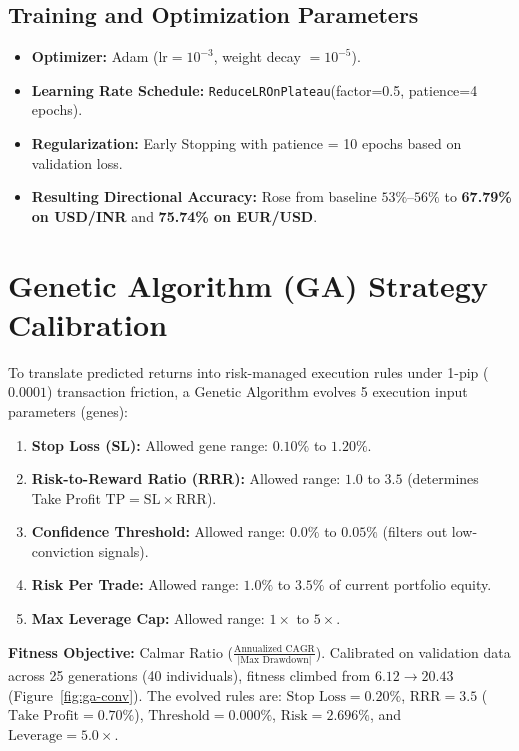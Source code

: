 \documentclass[11pt,oneside,letterpaper,english]{article}
\begin{document}
\subsection{Training and Optimization Parameters}
\begin{itemize}[leftmargin=1.2cm, itemsep=2pt]
	\item \textbf{Optimizer:} Adam ($\text{lr} = 10^{-3}$, weight decay $= 10^{-5}$).
	\item \textbf{Learning Rate Schedule:} \texttt{ReduceLROnPlateau}(factor=0.5, patience=4 epochs).
	\item \textbf{Regularization:} Early Stopping with patience = 10 epochs based on validation loss.
	\item \textbf{Resulting Directional Accuracy:} Rose from baseline $53\%$--$56\%$ to \textbf{67.79\% on USD/INR} and \textbf{75.74\% on EUR/USD}.
\end{itemize}

\section{Genetic Algorithm (GA) Strategy Calibration}

To translate predicted returns into risk-managed execution rules under 1-pip ($0.0001$) transaction friction, a Genetic Algorithm evolves 5 execution input parameters (genes):
\begin{enumerate}[leftmargin=1.2cm, itemsep=1pt]
	\item \textbf{Stop Loss (SL):} Allowed gene range: $0.10\%$ to $1.20\%$.
	\item \textbf{Risk-to-Reward Ratio (RRR):} Allowed range: $1.0$ to $3.5$ (determines Take Profit $\text{TP} = \text{SL} \times \text{RRR}$).
	\item \textbf{Confidence Threshold:} Allowed range: $0.0\%$ to $0.05\%$ (filters out low-conviction signals).
	\item \textbf{Risk Per Trade:} Allowed range: $1.0\%$ to $3.5\%$ of current portfolio equity.
	\item \textbf{Max Leverage Cap:} Allowed range: $1\times$ to $5\times$.
\end{enumerate}

\textbf{Fitness Objective:} Calmar Ratio ($\frac{\text{Annualized CAGR}}{|\text{Max Drawdown}|}$). Calibrated on validation data across 25 generations (40 individuals), fitness climbed from $6.12 \rightarrow 20.43$ (Figure~\ref{fig:ga-conv}). The evolved rules are: $\text{Stop Loss}=0.20\%$, $\text{RRR}=3.5$ ($\text{Take Profit}=0.70\%$), $\text{Threshold}=0.000\%$, $\text{Risk}=2.696\%$, and $\text{Leverage}=5.0\times$.
\end{document}
